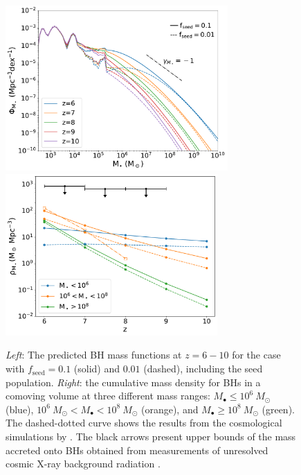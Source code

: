 \documentclass[twocolumn, twocolappendix]{aastex63}
\newcommand{\Msun}{M_\odot}
\newcommand{\fseed}{f_\mathrm{seed}}
\begin{document}
\begin{CJK*}{UTF8}{gbsn}
\begin{figure}
\centering
\includegraphics[width=85mm]{MF.pdf}\hspace{5mm}
\includegraphics[width=81mm]{rhoM_comb.pdf}
\caption{
{\it Left}: The predicted BH mass functions at $z=6-10$ for the case with $\fseed=0.1$ (solid) and $0.01$ (dashed), including the seed population.
{\it Right}: the cumulative mass density for BHs in a comoving volume at three different mass ranges: $M_\bullet \leq 10^6~\Msun$ (blue), $10^6~\Msun < M_\bullet < 10^8~\Msun$ (orange),
and $M_\bullet \geq 10^8~\Msun$ (green).
The dashed-dotted curve shows the results from the cosmological simulations by \citet{2022MNRAS.513..670N}.
The black arrows present upper bounds of the mass accreted onto BHs obtained from measurements of unresolved cosmic X-ray background radiation \citep{2013ApJ...778..130T}.
}
\label{fig:BHMF_rhoz}
\vspace{5mm}
\end{figure}



\end{CJK*}
\end{document}
